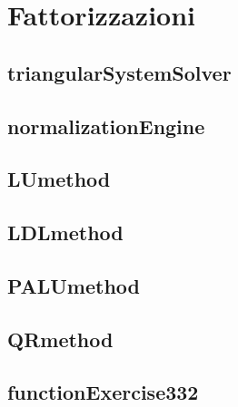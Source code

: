 \section{Fattorizzazioni}
\subsection{triangularSystemSolver}


\subsection{normalizationEngine}


\subsection{LUmethod}
\label{subsection:LUmethod}


\subsection{LDLmethod}
\label{subsection:LDLmethod}


\subsection{PALUmethod}
\label{subsection:PALUmethod}


\subsection{QRmethod}
\label{subsection:QRmethod}


\subsection{functionExercise332}
\label{subsection:functionExercise332}
